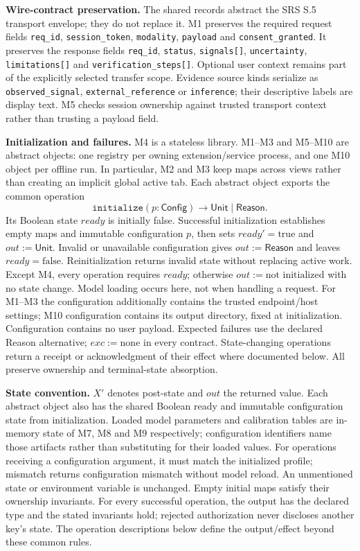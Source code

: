 \documentclass[12pt, titlepage]{article}
\newcommand{\ty}[1]{\textsf{#1}}
\begin{document}
\textbf{Wire-contract preservation.} The shared records abstract the SRS S.5 transport envelope; they do not replace it. M1 preserves the required request fields \texttt{req\_id}, \texttt{session\_token}, \texttt{modality}, \texttt{payload} and \texttt{consent\_granted}. It preserves the response fields \texttt{req\_id}, \texttt{status}, \texttt{signals[]}, \texttt{uncertainty}, \texttt{limitations[]} and \texttt{verification\_\allowbreak{}steps[]}. Optional user context remains part of the explicitly selected transfer scope. Evidence source kinds serialize as \texttt{observed\_\allowbreak{}signal}, \texttt{external\_\allowbreak{}reference} or \texttt{inference}; their descriptive labels are display text. M5 checks session ownership against trusted transport context rather than trusting a payload field.

\textbf{Initialization and failures.} M4 is a stateless library. M1--M3 and M5--M10 are abstract objects: one registry per owning extension/service process, and one M10 object per offline run. In particular, M2 and M3 keep maps across views rather than creating an implicit global active tab. Each abstract object exports the common operation
\[
\texttt{initialize}(p:\ty{Config})\to\ty{Unit}\mid\ty{Reason}.
\]
Its Boolean state $\mathit{ready}$ is initially false. Successful initialization establishes empty maps and immutable configuration $p$, then sets $\mathit{ready}'=\mathrm{true}$ and $out:=\ty{Unit}$. Invalid or unavailable configuration gives $out:=\ty{Reason}$ and leaves $\mathit{ready}=\mathrm{false}$. Reinitialization returns invalid state without replacing active work. Except M4, every operation requires $\mathit{ready}$; otherwise $out:=\text{not initialized}$ with no state change. Model loading occurs here, not when handling a request. For M1--M3 the configuration additionally contains the trusted endpoint/host settings; M10 configuration contains its output directory, fixed at initialization. Configuration contains no user payload. Expected failures use the declared Reason alternative; $exc:=\text{none}$ in every contract. State-changing operations return a receipt or acknowledgment of their effect where documented below. All preserve ownership and terminal-state absorption.

\textbf{State convention.} $X'$ denotes post-state and $out$ the returned value. Each abstract object also has the shared Boolean ready and immutable configuration state from initialization. Loaded model parameters and calibration tables are in-memory state of M7, M8 and M9 respectively; configuration identifiers name those artifacts rather than substituting for their loaded values. For operations receiving a configuration argument, it must match the initialized profile; mismatch returns configuration mismatch without model reload. An unmentioned state or environment variable is unchanged. Empty initial maps satisfy their ownership invariants. For every successful operation, the output has the declared type and the stated invariants hold; rejected authorization never discloses another key's state. The operation descriptions below define the output/effect beyond these common rules.
\end{document}
